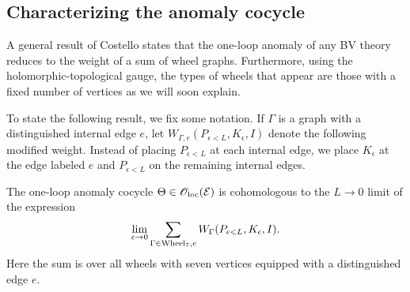 \documentclass[11pt]{amsart}
\begin{document}
\subsection{Characterizing the anomaly cocycle}


A general result of Costello \cite[Corollary 16.0.5]{CostelloWittengenus} states that the one-loop anomaly of any BV theory reduces to the weight of a sum of wheel graphs.
Furthermore, using the holomorphic-topological gauge, the types of wheels that appear are those with a fixed number of vertices as we will soon explain. 

To state the following result, we fix some notation. 
If $\Gamma$ is a graph with a distinguished internal edge $e$, let $W_{\Gamma,e}(P_{\epsilon<L},K_{\epsilon}, I)$ denote the following modified weight. 
Instead of placing $P_{\epsilon <L}$ at each internal edge, we place $K_\epsilon$ at the edge labeled $e$ and $P_{\epsilon<L}$ on the remaining internal edges.

\begin{lem}
The one-loop anomaly cocycle $\Theta \in {\mathscr O}_{\rm loc}(\mathcal E)$ is cohomologous to the $L \to 0$ limit of the expression
\[
\lim_{\epsilon \to 0} \sum_{\Gamma \in {\rm Wheel}_7, e} W_\Gamma(P_{\epsilon < L}, K_\epsilon,I) .
\]
Here the sum is over all wheels with seven vertices equipped with a distinguished edge $e$. 
\end{lem}
\end{document}
